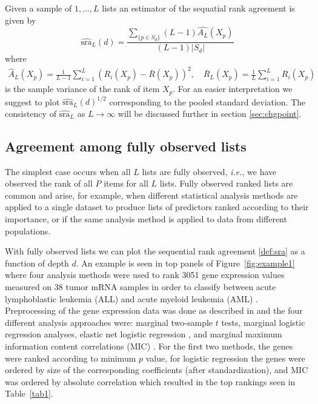 \documentclass[12pt,a4paper]{article}
\makeatletter
\newcommand{\ie}{\emph{i.e.}\@\xspace}
\theoremstyle{plain}
\makeatother
\begin{document}
Given a sample of $1,\ldots,L$ lists an estimator of the sequatial rank agreement is given by
\begin{equation}
\widehat{\textrm{sra}}_L(d)= \frac{\sum_{\{p \in S_d\}}(L-1)\widehat{A_L}(X_p)}{(L-1)|S_d|}\label{def:sra}
\end{equation}
where
\begin{align}
\widehat{A}_L(X_p) = \frac{1}{L-1}\sum_{i=1}^L (R_i(X_p) - \overline{R}(X_p))^2, \quad \overline{R}_L(X_p) = \frac{1}{L}\sum_{i=1}^L R_i(X_p)
\end{align}
is the sample variance of the rank of item $X_p$. For an easier interpretation we suggest to plot $\widehat{\textrm{sra}}_L(d)^{1/2}$ corresponding to the pooled standard deviation. The consistency of $\widehat{\textrm{sra}}_L$ as $L \rightarrow \infty$ will be discussed further in section \ref{sec:chgpoint}.



\subsection{Agreement among fully observed lists}
\label{sec:amfol}

The simplest case occurs when all $L$ lists are fully observed, \ie,
we have observed the rank of all $P$ items for all $L$ lists. Fully
observed ranked lists are common and arise, for example, when
different statistical analysis methods are applied to a single dataset
to produce lists of predictors ranked according to their importance,
or if the same analysis method is applied to data from different
populations.

With fully observed lists we can plot the sequential rank agreement
\eqref{def:sra} as a function of depth $d$. An example is seen in top
panels of Figure~\ref{fig:example1} where four analysis methods were
used to rank 3051 gene expression values measured on 38 tumor mRNA
samples in order to classify between acute lymphoblastic leukemia
(ALL) and acute myeloid leukemia (AML)
\citep{Golub1999}. Preprocessing of the gene expression data was done
as described in \citet{Dudoit2002} and the four different analysis
approaches were: marginal two-sample $t$ tests, marginal logistic
regression analyses, elastic net logistic regression
\citep{friedman2010regularization}, and marginal maximum information
content correlations (MIC) \citep{Reshef2011}. For the first two
methods, the genes were ranked according to minimum $p$ value, for
logistic regression the genes were ordered by size of the
corresponding coefficients (after standardization), and MIC was
ordered by absolute correlation which resulted in the top rankings
seen in Table~\ref{tab1}.
\end{document}
